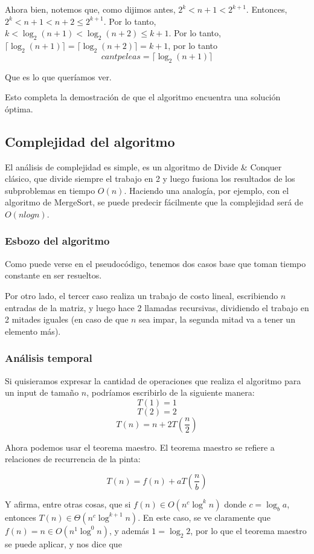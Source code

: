 Ahora bien, notemos que, como dijimos antes, $2^k < n + 1 < 2^{k+1}$. Entonces, $2^k < n + 1 < n + 2 \leq 2^{k+1}$. Por lo tanto, $k < \log_2(n + 1) < \log_2(n + 2) \leq k +1$. Por lo tanto, $\lceil \log _2 (n+1) \rceil = \lceil \log _2 (n+2) \rceil = k + 1$, por lo tanto 
\[cantpeleas = \lceil \log _2 (n+1) \rceil\]

Que es lo que queríamos ver.

Esto completa la demostración de que el algoritmo encuentra una solución óptima.

\subsection{Complejidad del algoritmo}

El análisis de complejidad es simple, es un algoritmo de Divide \& Conquer clásico, que divide siempre el trabajo en 2 y luego fusiona los resultados de los subproblemas en tiempo $O(n)$. Haciendo una analogía, por ejemplo, con el algoritmo de MergeSort, se puede predecir fácilmente que la complejidad será de $O(nlogn)$.

\subsubsection{Esbozo del algoritmo}

Como puede verse en el pseudocódigo, tenemos dos casos base que toman tiempo constante en ser resueltos.

Por otro lado, el tercer caso realiza un trabajo de costo lineal, escribiendo $n$ entradas de la matriz, y luego hace 2 llamadas recursivas, dividiendo el trabajo en 2 mitades iguales (en caso de que $n$ sea impar, la segunda mitad va a tener un elemento más).

\subsubsection{Análisis temporal}
Si quisieramos expresar la cantidad de operaciones que realiza el algoritmo para un input de tamaño $n$, podríamos escribirlo de la siguiente manera:
\[T(1) = 1\]
\[T(2) = 2\]
\[T(n) = n + 2 T \left(\frac{n}{2}\right)\]

Ahora podemos usar el teorema maestro. El teorema maestro se refiere a relaciones de recurrencia de la pinta:

\[T(n) = f(n) + a T\left(\frac{n}{b}\right)\]

Y afirma, entre otras cosas, que si $f(n) \in O(n^c \log^k n)$ donde $c = \log_b a$, entonces $T(n) \in \Theta(n^c \log^{k+1} n)$. En este caso, se ve claramente que $f(n) = n \in O(n^1 \log^0 n)$, y además $1 = \log_2 2$, por lo que el teorema maestro se puede aplicar, y nos dice que


